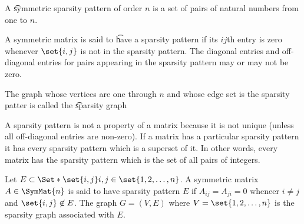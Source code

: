 
\sbasic






































\sstart
{}



A \t{symmetric sparsity pattern} of order $n$ is a set of pairs of natural numbers from one to $n$.

A symmetric matrix is said to \t{have a sparsity pattern} if its $ij$th entry is zero whenever $\set{i, j}$ is not in the sparsity pattern. The diagonal entries and off-diagonal entries for pairs appearing in the sparsity pattern may or may not be zero.

The graph whose vertices are one through $n$ and whose edge set is the sparsity patter is called the \t{sparsity graph}

A sparsity pattern is not a property of a matrix because it is not unique (unless all off-diagonal entries are non-zero). If a matrix has a particular sparsity pattern it has every sparsity pattern which is a superset of it.
In other words, every matrix has the sparsity pattern which is the set of all pairs of integers.


Let $E \subset \Set*{\set{i, j}}{i, j \in \set{1, 2, \dots, n}}$.
A symmetric matrix $A \in \SymMat{n}$ is said to have sparsity pattern $E$ if $A_{ij} = A_{ji} = 0$ wheneer $i \neq j$ and $\set{i, j} \not\in E$.
The graph $G = (V, E)$ where $V = \set{1, 2, \dots, n}$ is the sparsity graph associated with $E$.

